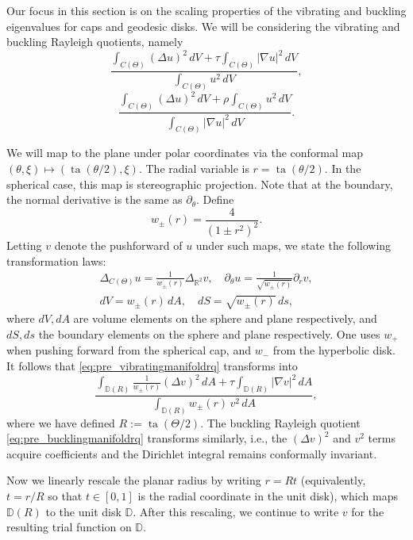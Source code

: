 \documentclass[11pt]{amsart}
\theoremstyle{definition}
\numberwithin{equation}{section}
\newcommand{\lapl}{\Delta}
\newcommand{\grad}{\nabla}
\newcommand{\R}{\mathbb{R}}
\newcommand{\D}{\mathbb{D}}
\newcommand{\ta}{\operatorname{ta}}
\begin{document}
Our focus in this section is on the scaling properties of the vibrating and buckling eigenvalues for caps and geodesic disks. We will be considering the vibrating and buckling Rayleigh quotients, namely
\begin{equation}\label{eq:pre_vibratingmanifoldrq}
\dfrac{\displaystyle \int_{C(\Theta)} (\lapl u)^2 \, dV + \tau \int_{C(\Theta)} |\grad u|^2 \, dV} {\displaystyle \int_{C(\Theta)}  u^2 \, dV},
\end{equation}
\begin{equation}\label{eq:pre_bucklingmanifoldrq}
\dfrac{\displaystyle \int_{C(\Theta)} (\lapl u)^2 \, dV + \rho \int_{C(\Theta)} u^2 \, dV} {\displaystyle \int_{C(\Theta)} |\grad u|^2 \, dV}.
\end{equation}

We will map to the plane under polar coordinates via the conformal map $(\theta, \xi) \mapsto (\ta(\theta/2), \xi)$. The radial variable is $r = 
\ta (\theta/2).$ In the spherical case, this map is stereographic projection. Note that at the boundary, the normal derivative is the same as $\partial_\theta$. Define
\[
w_\pm(r) = \frac{4}{(1 \pm r^2)^2}.
\]Letting $v$ denote the pushforward of $u$ under such maps, we state the following transformation laws:
\begin{gather*}
    \lapl_{C(\Theta)} u = \frac{1}{w_\pm(r)}\lapl_{\R^2} v, \quad \partial_\theta u = \frac{1}{\sqrt{w_\pm(r)}}\partial_r v, \\dV = {w_\pm(r)} \,dA, \quad dS = \sqrt{w_\pm(r)}\, ds,
\end{gather*}
where $dV, dA$ are volume elements on the sphere and plane respectively, and $dS, ds$ the boundary elements on the sphere and plane respectively. One uses $w_+$ when pushing forward from the spherical cap, and $w_-$ from the hyperbolic disk. It follows that \eqref{eq:pre_vibratingmanifoldrq} transforms into
\[
\dfrac{\displaystyle \int_{\D(R)}\frac{1}{w_\pm(r)}(\lapl v)^2 \, dA + \tau \int_{\D(R)}|\grad v|^2 \, dA}
{\displaystyle \int_{\D(R)}  w_\pm(r)\, v^2 \, dA},
\]
where we have defined $R := \ta(\Theta/2).$ The buckling Rayleigh quotient \eqref{eq:pre_bucklingmanifoldrq} transforms similarly, i.e., the $(\lapl v)^2$ and $v^2$ terms acquire coefficients and the Dirichlet integral remains conformally invariant.

Now we linearly rescale the planar radius by writing $r = Rt$ (equivalently, $t=r/R$ so that $t \in [0,1]$ is the radial coordinate in the unit disk), which maps $\D(R)$ to the unit disk $\D$. After this rescaling, we continue to write $v$ for the resulting trial function on $\D$.
\end{document}
